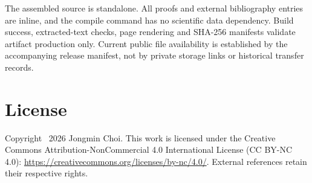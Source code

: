 \documentclass[11pt,a4paper]{article}
\numberwithin{equation}{section}
\theoremstyle{definition}\newtheorem{definition}[theorem]{Definition}
\theoremstyle{remark}\newtheorem{remark}[theorem]{Remark}
\begin{document}
The assembled source is standalone. All proofs and external bibliography entries are inline, and the compile command has no scientific data dependency. Build success, extracted-text checks, page rendering and SHA-256 manifests validate artifact production only. Current public file availability is established by the accompanying release manifest, not by private storage links or historical transfer records.

\section*{License}
Copyright \textcopyright\ 2026 Jongmin Choi. This work is licensed under the Creative Commons Attribution-NonCommercial 4.0 International License (CC BY-NC 4.0): \url{https://creativecommons.org/licenses/by-nc/4.0/}. External references retain their respective rights.
\end{document}
